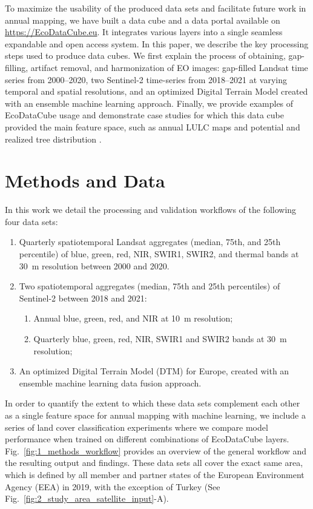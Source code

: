 To maximize the usability of the produced data sets and facilitate future work in annual mapping, we have built a data cube and a data portal available on \url{https://EcoDataCube.eu}. It integrates various layers into a single seamless expandable and open access system. In this paper, we describe the key processing steps used to produce data cubes. We first explain the process of obtaining, gap-filling, artifact removal, and harmonization of EO images: gap-filled Landsat time series from 2000--2020, two Sentinel-2 time-series from 2018--2021 at varying temporal and spatial resolutions, and an optimized Digital Terrain Model created with an ensemble machine learning approach. Finally, we provide examples of EcoDataCube usage and demonstrate case studies for which this data cube provided the main feature space, such as annual LULC maps \citep{witjes2022spatiotemporal} and potential and realized tree distribution \citep{bonannella2022forest}.

\section*{Methods and Data}
In this work we detail the processing and validation workflows of the following four data sets:
\begin{enumerate}
\item Quarterly spatiotemporal Landsat aggregates (median, 75th, and 25th percentile) of blue, green, red, NIR, SWIR1, SWIR2, and thermal bands at 30~m resolution between 2000 and 2020.
\item Two spatiotemporal aggregates (median, 75th and 25th percentiles) of Sentinel-2 between 2018 and 2021:
\begin{enumerate}
\item Annual blue, green, red, and NIR at 10~m resolution;
\item Quarterly blue, green, red, NIR, SWIR1 and SWIR2 bands at 30~m resolution;
\end{enumerate}
\item An optimized Digital Terrain Model (DTM) for Europe, created with an ensemble machine learning data fusion approach.
\end{enumerate}

In order to quantify the extent to which these data sets complement each other as a single feature space for annual mapping with machine learning, we include a series of land cover classification experiments where we compare model performance when trained on different combinations of EcoDataCube layers. Fig.\@~\ref{fig:1_methods_workflow} provides an overview of the general workflow and the resulting output and findings. These data sets all cover the exact same area, which is defined by all member and partner states of the European Environment Agency (EEA) in 2019, with the exception of Turkey (See Fig.\@~\ref{fig:2_study_area_satellite_input}-A).

